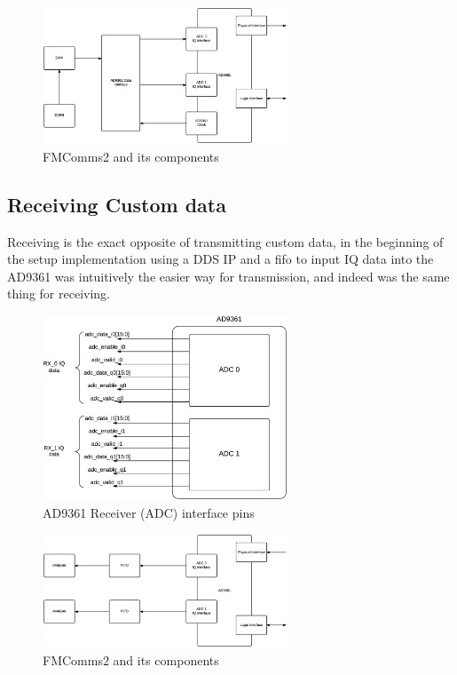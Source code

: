 \begin{figure}[htbp]
    \centering
    \includegraphics[width=0.65\textwidth]{./figures/dac_dma}
    \caption{ FMComms2 and its components
    \label{fig:fmcomm}}
\end{figure}

\subsection{Receiving Custom data}

Receiving is the exact opposite of transmitting custom data, in the beginning of
the setup implementation using a DDS IP and a fifo to input IQ data into the
AD9361 was intuitively the easier way for transmission, and indeed was the same
thing for receiving.

\begin{figure}[htbp]
    \centering
    \includegraphics[width=0.65\textwidth]{./figures/ad9361rx_pins}
    \caption{ AD9361 Receiver (ADC) interface pins
    \label{fig:rxpins}}
\end{figure}

\begin{figure}[htbp]
    \centering
    \includegraphics[width=0.65\textwidth]{./figures/adc_fifo}
    \caption{ FMComms2 and its components
    \label{fig:ad9361rxfifo}}
\end{figure}

